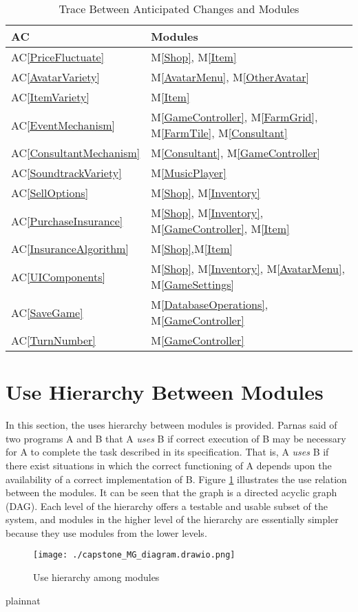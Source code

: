 \documentclass[12pt, titlepage]{article}
\newcommand{\acref}[1]{AC\ref{#1}}
\newcommand{\mref}[1]{M\ref{#1}}
\begin{document}
\begin{table}[H]
\centering
\begin{tabular}{p{} p{}}
\toprule
\textbf{AC} & \textbf{Modules}\\
\midrule
\acref{PriceFluctuate} & \mref{Shop}, \mref{Item}\\
\acref{AvatarVariety} & \mref{AvatarMenu}, \mref{OtherAvatar}\\
\acref{ItemVariety} & \mref{Item}\\
\acref{EventMechanism} & \mref{GameController}, \mref{FarmGrid}, \mref{FarmTile}, \mref{Consultant}\\
\acref{ConsultantMechanism} & \mref{Consultant}, \mref{GameController}\\
\acref{SoundtrackVariety} & \mref{MusicPlayer}\\
\acref{SellOptions} & \mref{Shop}, \mref{Inventory}\\
\acref{PurchaseInsurance} & \mref{Shop}, \mref{Inventory}, \mref{GameController}, \mref{Item}\\
\acref{InsuranceAlgorithm} & \mref{Shop},\mref{Item}\\
\acref{UIComponents} & \mref{Shop}, \mref{Inventory}, \mref{AvatarMenu}, \mref{GameSettings}\\
\acref{SaveGame} & \mref{DatabaseOperations}, \mref{GameController}\\
\acref{TurnNumber} & \mref{GameController}\\
\bottomrule
\end{tabular}
\caption{Trace Between Anticipated Changes and Modules}
\label{TblACT}
\end{table}

\section{Use Hierarchy Between Modules} \label{SecUse}

In this section, the uses hierarchy between modules is
provided. Parnas said of two programs A and B that A {\em uses} B if
correct execution of B may be necessary for A to complete the task described in
its specification. That is, A {\em uses} B if there exist situations in which
the correct functioning of A depends upon the availability of a correct
implementation of B.  Figure \ref{FigUH} illustrates the use relation between
the modules. It can be seen that the graph is a directed acyclic graph
(DAG). Each level of the hierarchy offers a testable and usable subset of the
system, and modules in the higher level of the hierarchy are essentially simpler
because they use modules from the lower levels.

\begin{figure}[H]
\centering
\texttt{[image: ./capstone\_MG\_diagram.drawio.png]}
\caption{Use hierarchy among modules}
\label{FigUH}
\end{figure}


 {plainnat}


\newpage{}
\end{document}
